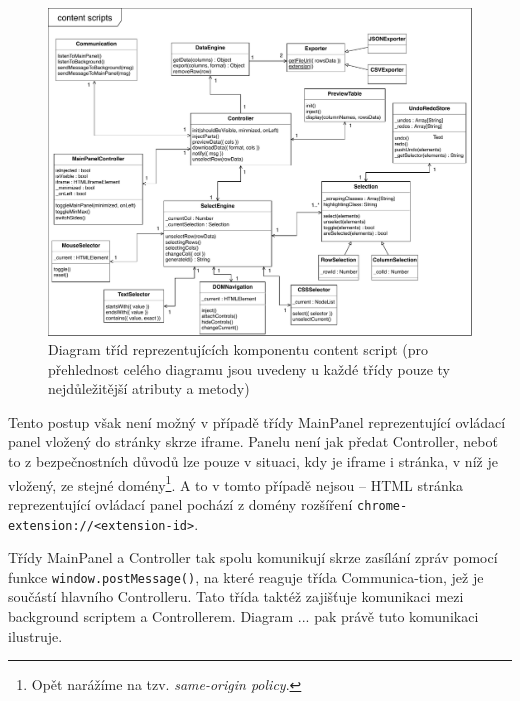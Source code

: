\documentclass[thesis=B,czech]{FITthesis}[2012/06/26]
\begin{document}
\begin{figure}
	\includegraphics[width=\linewidth]{images/content_scripts_class_diagram.pdf}
	\caption[Diagram tříd reprezentujících komponentu content script]{Diagram tříd reprezentujících komponentu content script (pro přehlednost celého diagramu jsou uvedeny u každé třídy pouze ty nejdůležitější atributy a metody)}
	\label{fig:content_scripts_diagram}
\end{figure}

Tento postup však není možný v případě třídy MainPanel reprezentující ovládací panel vložený do stránky skrze iframe. Panelu není jak předat Controller, neboť to z bezpečnostních důvodů lze pouze v situaci, kdy je iframe i stránka, v níž je vložený, ze stejné domény\footnote{Opět narážíme na tzv. \emph{same-origin policy}.}. A to v tomto případě nejsou -- HTML stránka reprezentující ovládací panel pochází z domény rozšíření \verb|chrome-extension://<extension-id>|. 

Třídy MainPanel a Controller tak spolu komunikují skrze zasílání zpráv pomocí funkce \verb|window.postMessage()|, na které reaguje třída Communica-tion, jež je součástí hlavního Controlleru. Tato třída taktéž zajišťuje komunikaci mezi background scriptem a Controllerem. Diagram ... pak právě tuto komunikaci ilustruje.
\end{document}
